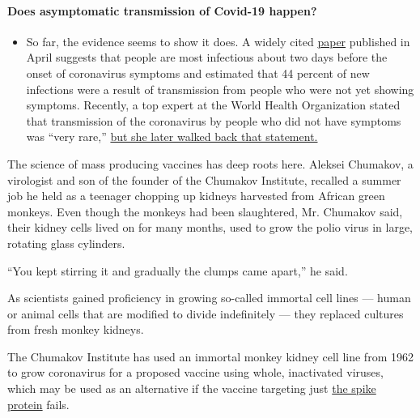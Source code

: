 \begin{itemize}
{  \paragraph{Does asymptomatic transmission of Covid-19
  happen?}\label{does-asymptomatic-transmission-of-covid-19-happen}}

  \begin{itemize}
  \tightlist
  \item
    So far, the evidence seems to show it does. A widely cited
    \href{https://www.nature.com/articles/s41591-020-0869-5}{paper}
    published in April suggests that people are most infectious about
    two days before the onset of coronavirus symptoms and estimated that
    44 percent of new infections were a result of transmission from
    people who were not yet showing symptoms. Recently, a top expert at
    the World Health Organization stated that transmission of the
    coronavirus by people who did not have symptoms was ``very rare,''
    \href{https://www.nytimes3xbfgragh.onion/2020/06/09/world/coronavirus-updates.html?action=click\&pgtype=Article\&state=default\&region=MAIN_CONTENT_3\&context=storylines_faq\#link-1f302e21}{but
    she later walked back that statement.}
  \end{itemize}
\end{itemize}

The science of mass producing vaccines has deep roots here. Aleksei
Chumakov, a virologist and son of the founder of the Chumakov Institute,
recalled a summer job he held as a teenager chopping up kidneys
harvested from African green monkeys. Even though the monkeys had been
slaughtered, Mr. Chumakov said, their kidney cells lived on for many
months, used to grow the polio virus in large, rotating glass cylinders.

``You kept stirring it and gradually the clumps came apart,'' he said.

As scientists gained proficiency in growing so-called immortal cell
lines --- human or animal cells that are modified to divide indefinitely
--- they replaced cultures from fresh monkey kidneys.

The Chumakov Institute has used an immortal monkey kidney cell line from
1962 to grow coronavirus for a proposed vaccine using whole, inactivated
viruses, which may be used as an alternative if the vaccine targeting
just
\href{https://www.nytimes3xbfgragh.onion/2020/07/28/health/coronavirus-mutation-spike-treatment.html?action=click\&module=Latest\&pgtype=Homepage}{the
spike protein} fails.

